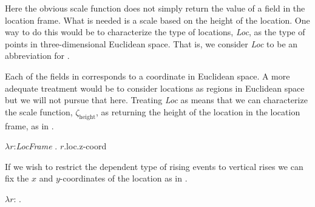 Here the obvious scale function does not simply return the value of a
field in the location frame.  What is needed is a scale based on the
height of the location.  One way to do this would be to characterize
the type of locations, \textit{Loc}, as the type of points in three-dimensional
Euclidean space.  That is, we consider \textit{Loc} to be an
abbreviation for \nexteg{}.
\begin{ex} 
\end{ex} 
Each of the fields in \preveg{} corresponds to a coordinate in
Euclidean space.  A more adequate treatment would be to consider
locations as regions in Euclidean space but we will not pursue that
here.  Treating \textit{Loc} as \preveg{} means that we can
characterize the scale function, $\zeta_{\mathrm{height}}$, as returning the height of the
location in the location frame, as in \nexteg{}.
\begin{ex} 
$\lambda r$:\textit{LocFrame} . $r$.loc.z-coord 
\end{ex} 
If we wish to restrict the dependent type of rising events to vertical
rises we can fix the $x$ and $y$-coordinates of the location as in
\nexteg{}.
\begin{ex} 
$\lambda
r$: .\\  
\hspace*{2em}  
    \end{ex}

